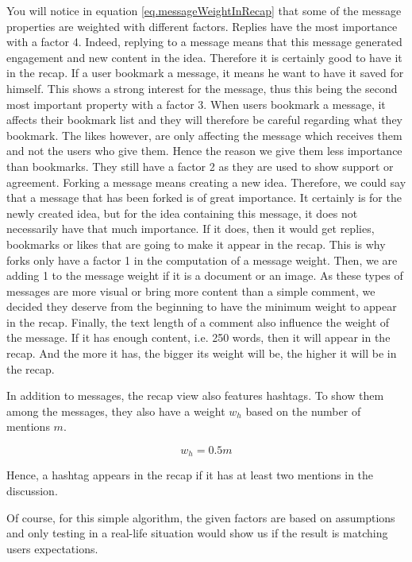 \documentclass[a4paper,12pt, oneside]{article}
\begin{document}
You will notice in equation \ref{eq.messageWeightInRecap} that some of the message properties are weighted with different factors.
Replies have the most importance with a factor 4.
Indeed, replying to a message means that this message generated engagement and new content in the idea.
Therefore it is certainly good to have it in the recap.
If a user bookmark a message, it means he want to have it saved for himself.
This shows a strong interest for the message, thus this being the second most important property with a factor 3.
When users bookmark a message, it affects their bookmark list and they will therefore be careful regarding what they bookmark.
The likes however, are only affecting the message which receives them and not the users who give them.
Hence the reason we give them less importance than bookmarks.
They still have a factor 2 as they are used to show support or agreement.
Forking a message means creating a new idea.
Therefore, we could say that a message that has been forked is of great importance.
It certainly is for the newly created idea, but for the idea containing this message, it does not necessarily have that much importance.
If it does, then it would get replies, bookmarks or likes that are going to make it appear in the recap.
This is why forks only have a factor 1 in the computation of a message weight.
Then, we are adding 1 to the message weight if it is a document or an image.
As these types of messages are more visual or bring more content than a simple comment, we decided they deserve from the beginning to have the minimum weight to appear in the recap.
Finally, the text length of a comment also influence the weight of the message.
If it has enough content, i.e. 250 words, then it will appear in the recap.
And the more it has, the bigger its weight will be, the higher it will be in the recap.

In addition to messages, the recap view also features hashtags.
To show them among the messages, they also have a weight $w_h$ based on the number of mentions $m$.

\begin{equation}
    \label{eq.hashtagWeightInRecap}
    w_h = 0.5m
\end{equation}

Hence, a hashtag appears in the recap if it has at least two mentions in the discussion.

Of course, for this simple algorithm, the given factors are based on assumptions and only testing in a real-life situation would show us if the result is matching users expectations.
\end{document}
